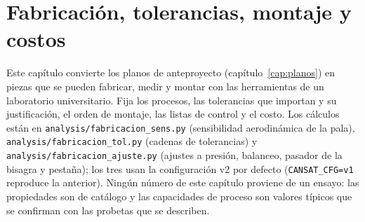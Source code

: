 \chapter{Fabricación, tolerancias, montaje y costos}\label{cap:fabricacion}

Este capítulo convierte los planos de anteproyecto (capítulo~\ref{cap:planos}) en piezas
que se pueden fabricar, medir y montar con las herramientas de un laboratorio
universitario. Fija los procesos, las tolerancias que importan y su justificación, el
orden de montaje, las listas de control y el costo. Los cálculos están en
\texttt{analysis/fabricacion\_sens.py} (sensibilidad aerodinámica de la pala),
\texttt{analysis/fabricacion\_tol.py} (cadenas de tolerancias) y
\texttt{analysis/fabricacion\_ajuste.py} (ajustes a presión, balanceo, pasador de la bisagra y
pestaña); los tres usan la configuración v2 por defecto (\texttt{CANSAT\_CFG=v1} reproduce la
anterior). Ningún número de este capítulo proviene de un ensayo: las propiedades son de catálogo y las
capacidades de proceso son valores típicos que se confirman con las probetas que se
describen.

